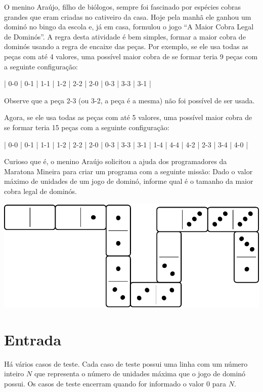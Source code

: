 O menino Araújo, filho de biólogos, sempre foi fascinado por espécies cobras grandes que eram criadas no cativeiro da casa. Hoje pela manhã ele ganhou um dominó no bingo da escola e, já em casa, formulou o jogo ``A Maior Cobra Legal de Dominós''. A regra desta atividade é bem simples, formar a maior cobra de dominós usando a regra de encaixe das peças. Por exemplo, se ele usa todas as peças com até 4 valores, uma possível maior cobra de se formar teria 9 peças com a seguinte configuração:

\begin{center}
  | 0-0 | 0-1 | 1-1 | 1-2 | 2-2 | 2-0 | 0-3 | 3-3 | 3-1 |
\end{center}

Observe que a peça 2-3 (ou 3-2, a peça é a mesma) não foi possível de ser usada.

Agora, se ele usa todas as peças com até 5 valores, uma possível maior cobra de se formar teria 15 peças com a seguinte configuração:

\begin{center}
  | 0-0 | 0-1 | 1-1 | 1-2 | 2-2 | 2-0 | 0-3 | 3-3 | 3-1 | 1-4 | 4-4 | 4-2 | 2-3 | 3-4 | 4-0 |
\end{center}

Curioso que é, o menino Araújo solicitou a ajuda dos programadores da Maratona Mineira para criar um programa com a seguinte missão: Dado o valor máximo de unidades de um jogo de dominó, informe qual é o tamanho da maior cobra legal de dominós.

\begin{center}
  \includegraphics[width=0.7\linewidth]{dominos.pdf}
\end{center}


\section*{Entrada}

Há vários casos de teste. Cada caso de teste possui uma linha com um número inteiro $N$ que representa o número de unidades máxima que o jogo de dominó possui. Os casos de teste encerram quando for informado o valor $0$ para $N$.

